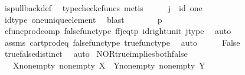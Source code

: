 \begin{isabellebody}
\ is{\isacharunderscore}{\kern0pt}pullback{\isacharunderscore}{\kern0pt}def\ \isamarkupfalse%
\ {\isacharparenleft}{\kern0pt}typecheck{\isacharunderscore}{\kern0pt}cfuncs{\isacharcomma}{\kern0pt}\ metis{\isacharparenright}{\kern0pt}\isanewline
\ \ \isamarkupfalse%
\ \isamarkupfalse%
\ {\isachardoublequoteopen}j\ {\isacharequal}{\kern0pt}\ id\ one{\isachardoublequoteclose}\isanewline
\ \ \ \ \isamarkupfalse%
\ id{\isacharunderscore}{\kern0pt}type\ one{\isacharunderscore}{\kern0pt}unique{\isacharunderscore}{\kern0pt}element\ \isamarkupfalse%
\ blast\isanewline
\ \ \isamarkupfalse%
\ \isamarkupfalse%
\ {\isachardoublequoteopen}{\isasymlangle}{\isasymf}{\isacharcomma}{\kern0pt}{\isasymf}{\isasymrangle}\ {\isacharequal}{\kern0pt}\ {\isasymlangle}p{\isacharcomma}{\kern0pt}{\isasymt}{\isasymrangle}{\isachardoublequoteclose}\isanewline
\ \ \ \ \isamarkupfalse%
\ cfunc{\isacharunderscore}{\kern0pt}prod{\isacharunderscore}{\kern0pt}comp\ false{\isacharunderscore}{\kern0pt}func{\isacharunderscore}{\kern0pt}type\ ff{\isacharunderscore}{\kern0pt}j{\isacharunderscore}{\kern0pt}eq{\isacharunderscore}{\kern0pt}tp\ id{\isacharunderscore}{\kern0pt}right{\isacharunderscore}{\kern0pt}unit{}\ j{\isacharunderscore}{\kern0pt}type\ \isamarkupfalse%
\ auto\isanewline
\ \ \isamarkupfalse%
\ \isamarkupfalse%
\ {\isachardoublequoteopen}{\isasymf}\ {\isacharequal}{\kern0pt}\ {\isasymt}{\isachardoublequoteclose}\isanewline
\ \ \ \ \isamarkupfalse%
\ assms\ cart{\isacharunderscore}{\kern0pt}prod{\isacharunderscore}{\kern0pt}eq{}\ false{\isacharunderscore}{\kern0pt}func{\isacharunderscore}{\kern0pt}type\ true{\isacharunderscore}{\kern0pt}func{\isacharunderscore}{\kern0pt}type\ \isamarkupfalse%
\ auto\isanewline
\ \ \isamarkupfalse%
\ \isamarkupfalse%
\ False\isanewline
\ \ \ \ \isamarkupfalse%
\ true{\isacharunderscore}{\kern0pt}false{\isacharunderscore}{\kern0pt}distinct\ \isamarkupfalse%
\ auto\isanewline
{}\isamarkupfalse%
%
\endisatagproof
{\isafoldproof}%
%
\isadelimproof
\isanewline
%
\endisadelimproof
\isanewline
{}\isamarkupfalse%
\ NOR{\isacharunderscore}{\kern0pt}true{\isacharunderscore}{\kern0pt}implies{\isacharunderscore}{\kern0pt}both{\isacharunderscore}{\kern0pt}false{\isacharcolon}{\kern0pt}\isanewline
\ \ \ X{\isacharunderscore}{\kern0pt}nonempty{\isacharcolon}{\kern0pt}\ {\isachardoublequoteopen}nonempty\ X{\isachardoublequoteclose}\ \ Y{\isacharunderscore}{\kern0pt}nonempty{\isacharcolon}{\kern0pt}\ {\isachardoublequoteopen}nonempty\ Y{\isachardoublequoteclose}\isanewline

\end{isabellebody}
